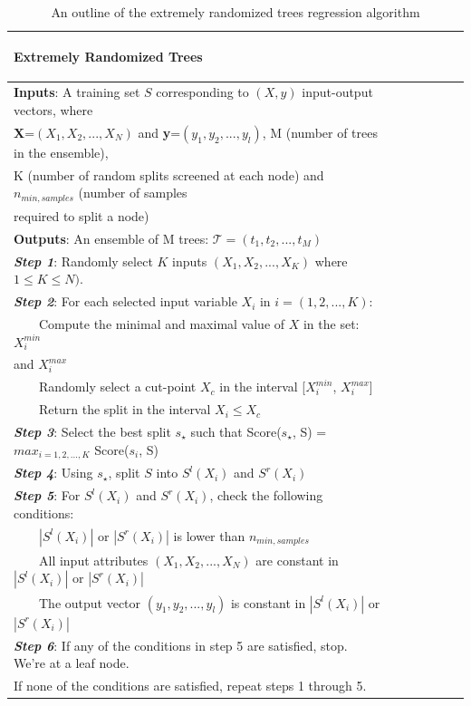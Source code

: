 \documentclass[a4paper,fleqn,usenatbib]{mnras}
\newcommand{\tabitem}{~~\llap{\textbullet}~~}
\begin{document}
 
\begin{table}
\begin{minipage}{140mm}
 \caption{An outline of the extremely randomized trees regression algorithm}
 \label{symbols}
 \begin{tabular}{@{}lcccccc}
  \hline
  \hline
  \begin{centering}
  Extremely Randomized Trees
  \end{centering} \\
  \hline
  \textbf{Inputs}: A training set $S$ corresponding to \textbf{$(X, y)$} input-output vectors, where \\ \textbf{X}=$(X_1,X_2,...,X_N)$ and  \textbf{y}=$(y_1,y_2,...,y_l)$, M (number of trees in the ensemble), \\ K (number of random splits screened at each node) and $n_{min,samples}$ (number of samples \\ required to split a node)\\
  \textbf{Outputs}: An ensemble of M trees: $\mathcal{T} = (t_1, t_2,...,t_M)$ \\
  \hline
  \textit{\textbf{Step 1}}: Randomly select $K$ inputs $(X_1,X_2,...,X_K)$ where $1\leq K \leq N)$. \\
  \hline 
  \textit{\textbf{Step 2}}: For each selected input variable $X_i$ in $i=(1,2,...,K)$: \\
  \tabitem Compute the minimal and maximal value of $X$ in the set: $X_i^{min}$ \\ and $X_i^{max}$ \\
  \tabitem Randomly select a cut-point $X_c$ in the interval [$X_i^{min}$, $X_i^{max}$] \\
  \tabitem Return the split in the interval $X_i \leq X_c$ \\
  \hline
  \textit{\textbf{Step 3}}: Select the best split $s_{\star}$ such that Score($s_{\star}$, S) = $max_{i=1,2,...,K}$ Score($s_{i}$, S) \\
  \hline
  \textbf{\textit{Step 4}}: Using $s_{\star}$, split $S$ into $S^l(X_i)$  and $S^r(X_i)$ \\
  \hline
  \textbf{\textit{Step 5}}: For $S^l(X_i)$  and $S^r(X_i)$, check the following conditions: \\
  \tabitem $|S^l(X_i)|$ or $|S^r(X_i)|$ is lower than $n_{min,samples}$ \\
  \tabitem All input attributes $(X_1,X_2,...,X_N)$ are constant in $|S^l(X_i)|$ or $|S^r(X_i)|$ \\
  \tabitem The output vector $(y_1,y_2,...,y_l)$ is constant in $|S^l(X_i)|$ or $|S^r(X_i)|$ \\
  \hline
  \textbf{\textit{Step 6}}: If any of the conditions in step 5 are satisfied, stop. We're at a leaf node. \\
  If none of the conditions are satisfied, repeat steps 1 through 5. \\
  \hline 
\end{tabular}
\end{minipage}
\end{table}
\end{document}
